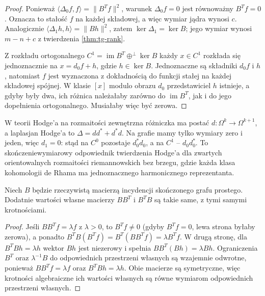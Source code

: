 \begin{proof}
Ponieważ $\langle\Delta_0f,f\rangle=\|B^Tf\|^2$,
warunek $\Delta_0f=0$ jest równoważny $B^Tf=0$.
Oznacza to stałość $f$ na każdej składowej,
a więc wymiar jądra wynosi $c$.
Analogicznie $\langle\Delta_1h,h\rangle=\|Bh\|^2$,
zatem $\ker\Delta_1=\ker B$; jego wymiar
wynosi $m-n+c$ z twierdzenia \ref{thm:tg-rank}.

Z rozkładu ortogonalnego
$C^1=\operatorname{im}B^T\oplus^\perp\ker B$
każdy $x\in C^1$ rozkłada się jednoznacznie na
$x=d_0f+h$, gdzie $h\in\ker B$.
Jednoznaczne są składniki $d_0f$ i $h$, natomiast
$f$ jest wyznaczona z dokładnością do funkcji stałej
na każdej składowej spójnej. W klasie $[x]$
modulo obrazu $d_0$ przedstawiciel $h$ istnieje,
a gdyby były dwa, ich różnica należałaby zarówno
do $\operatorname{im}B^T$, jak i do jego dopełnienia
ortogonalnego. Musiałaby więc być zerowa.
\end{proof}

\begin{uwaga}
W teorii Hodge'a na rozmaitości zewnętrzna różniczka
ma postać $d:\Omega^k\to\Omega^{k+1}$, a laplasjan
Hodge'a to $\Delta=dd^*+d^*d$. Na grafie mamy tylko
wymiary zero i jeden, więc $d_1=0$: stąd na
$C^0$ pozostaje $d_0^*d_0$, a na $C^1$ -- $d_0d_0^*$.
To skończeniewymiarowy odpowiednik twierdzenia Hodge'a
dla zwartych orientowalnych rozmaitości riemannowskich
bez brzegu, gdzie każda klasa kohomologii de Rhama
ma jednoznacznego harmonicznego reprezentanta.
\end{uwaga}

\begin{stwierdzenie}
Niech $B$ będzie rzeczywistą macierzą incydencji
skończonego grafu prostego.
Dodatnie wartości własne macierzy $BB^T$ i $B^TB$
są takie same, z tymi samymi krotnościami.
\end{stwierdzenie}

\begin{proof}
Jeśli $BB^Tf=\lambda f$ z $\lambda>0$, to
$B^Tf\ne0$ (gdyby $B^Tf=0$, lewa strona byłaby zerowa),
a ponadto
$B^TB(B^Tf)=B^T(BB^Tf)=\lambda B^Tf$.
W drugą stronę, dla $B^TBh=\lambda h$ wektor
$Bh$ jest niezerowy i spełnia
$BB^T(Bh)=\lambda Bh$.
Ograniczenia $B^T$ oraz $\lambda^{-1}B$ do odpowiednich
przestrzeni własnych są wzajemnie odwrotne, ponieważ
$BB^Tf=\lambda f$ oraz $B^TBh=\lambda h$.
Obie macierze są symetryczne, więc krotności
algebraiczne ich wartości własnych są równe wymiarom
odpowiednich przestrzeni własnych.
\end{proof}


